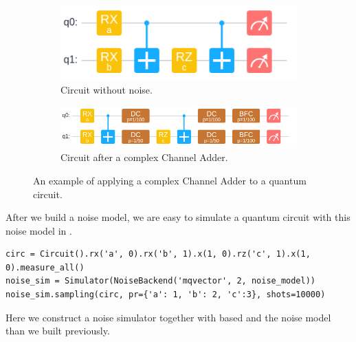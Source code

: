 \begin{figure}
    \centering
    \begin{subfigure}{0.32\textwidth}
        \centering
        \includegraphics[width=\textwidth]{images/4_3_no_complex.png}
        \caption{Circuit without noise.}
    \end{subfigure}
    \begin{subfigure}{0.5\textwidth}
        \centering
        \includegraphics[width=\textwidth]{images/4_3_complex.png}
        \caption{Circuit after a complex Channel Adder.}
    \end{subfigure}
    \caption{An example of applying a complex Channel Adder to a quantum circuit.}
    \label{fig:complex_adder}
\end{figure}

After we build a noise model, we are easy to simulate a quantum circuit with this noise model in \MindQuantum.
\begin{lstlisting}
circ = Circuit().rx('a', 0).rx('b', 1).x(1, 0).rz('c', 1).x(1, 0).measure_all()
noise_sim = Simulator(NoiseBackend('mqvector', 2, noise_model))
noise_sim.sampling(circ, pr={'a': 1, 'b': 2, 'c':3}, shots=10000)
\end{lstlisting}
Here we construct a noise simulator together with  based \NoiseBackend and the noise model than we built previously.
